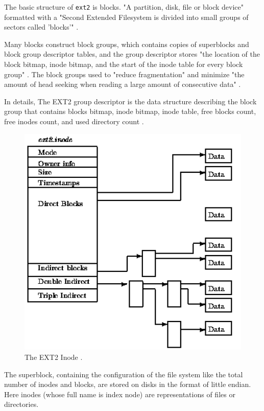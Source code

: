 \documentclass[a4paper]{article}
\begin{document}
The basic structure of \texttt{ext2} is blocks. "A partition, disk, file or block device" formatted with a "Second Extended Filesystem is divided into small groups of sectors called 'blocks'" \cite{nongnu}.

Many blocks construct block groups, which contains copies of superblocks and block group descriptor tables, and the group descriptor stores "the location of the block bitmap, inode bitmap, and the start of the inode table for every block group" \cite{ext2wiki}. The block groups used to "reduce fragmentation" and minimize "the amount of head seeking when reading a large amount of consecutive data" \cite{kerneldoc}.

In details, The EXT2 group descriptor is the data structure describing the block group that contains blocks bitmap, inode bitmap, inode table, free blocks count, free inodes count, and used directory count \cite{science}.
\begin{figure}[H]
    \centering
    \includegraphics[width=1\textwidth]{2.png}
    \caption{The EXT2 Inode \cite{science}.}
\end{figure}
The superblock, containing the configuration of the file system like the total number of inodes and blocks, are stored on disks in the format of little endian. Here inodes (whose full name is index node) are representations of files or directories.
\end{document}
